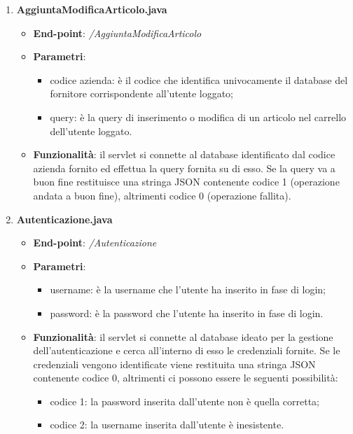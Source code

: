 \documentclass[12pt, a4paper, titlepage]{report}
\begin{document}
	\begin{enumerate}
		\item \textbf{AggiuntaModificaArticolo.java}
		\begin{itemize}
			\item \textbf{End-point}: \textit{/AggiuntaModificaArticolo}
			\item \textbf{Parametri}:
			\begin{itemize}
				\item codice azienda: è il codice che identifica univocamente il database del fornitore corrispondente all'utente loggato;
				\item query: è la query di inserimento o modifica di un articolo nel carrello dell'utente loggato.
			\end{itemize}
			\item \textbf{Funzionalità}: il servlet si connette al database identificato dal codice azienda fornito ed effettua la query fornita su di esso. Se la query va a buon fine restituisce una stringa JSON contenente codice 1 (operazione andata a buon fine), altrimenti codice 0 (operazione fallita).
		\end{itemize}
	
		\item \textbf{Autenticazione.java}
		\begin{itemize}
			\item \textbf{End-point}: \textit{/Autenticazione}
			\item \textbf{Parametri}:
			\begin{itemize}
				\item username: è la username che l'utente ha inserito in fase di login;
				\item password: è la password che l'utente ha inserito in fase di login.
			\end{itemize}
			\item \textbf{Funzionalità}: il servlet si connette al database ideato per la gestione dell'autenticazione e cerca all'interno di esso le credenziali fornite. Se le credenziali vengono identificate viene restituita una stringa JSON contenente codice 0, altrimenti ci possono essere le seguenti possibilità:
			\begin{itemize}
				\item codice 1: la password inserita dall'utente non è quella corretta;
				\item codice 2: la username inserita dall'utente è inesistente.
			\end{itemize}
		\end{itemize}
	

\end{enumerate}
\end{document}
